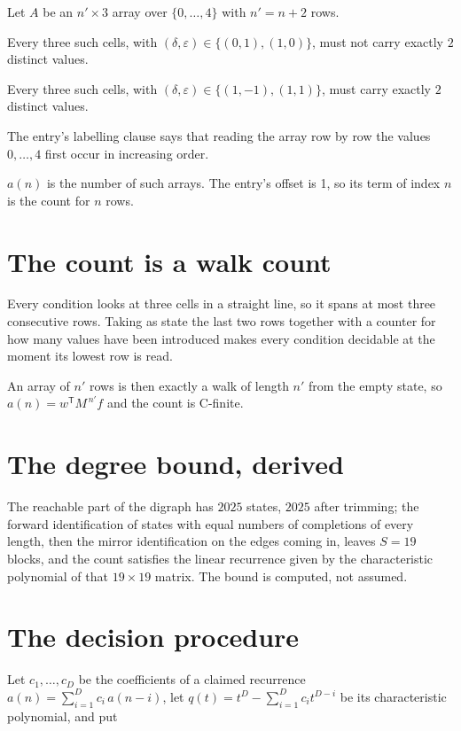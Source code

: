 \documentclass[11pt]{article}
\theoremstyle{definition}
\begin{document}
Let $A$ be an $n' \times 3$ array over $\{0,\dots,4\}$ with $n' = n + 2$ rows.

Every three such cells, with $(\delta,\varepsilon) \in \{(0,1), (1,0)\}$, must not carry exactly $2$ distinct values.

Every three such cells, with $(\delta,\varepsilon) \in \{(1,-1), (1,1)\}$, must carry exactly $2$ distinct values.

The entry's labelling clause says that reading the array row by row the values $0,\dots,4$ first occur in increasing order.

$a(n)$ is the number of such arrays. The entry's offset is 1, so its term of index $n$ is the count for $n$ rows.

\section{The count is a walk count}

Every condition looks at three cells in a straight line, so it spans at most three consecutive rows. Taking as state the last two rows together with a counter for how many values have been introduced makes every condition decidable at the moment its lowest row is read.

An array of $n'$ rows is then exactly a walk of length $n'$ from the empty state, so $a(n) = w^{\mathsf T}M^{\,n'}f$ and the count is C-finite.

\section{The degree bound, derived}

The reachable part of the digraph has $2025$ states, $2025$ after trimming; the forward identification of states with equal numbers of completions of every length, then the mirror identification on the edges coming in, leaves $S = 19$ blocks, and the count satisfies the linear recurrence given by the characteristic polynomial of that $19\times19$ matrix. The bound is computed, not assumed.

\section{The decision procedure}

Let $c_1,\dots,c_D$ be the coefficients of a claimed recurrence $a(n) = \sum_{i=1}^{D} c_i\,a(n-i)$, let $q(t) = t^{D} - \sum_{i=1}^{D} c_i t^{D-i}$ be its characteristic polynomial, and put
\end{document}
